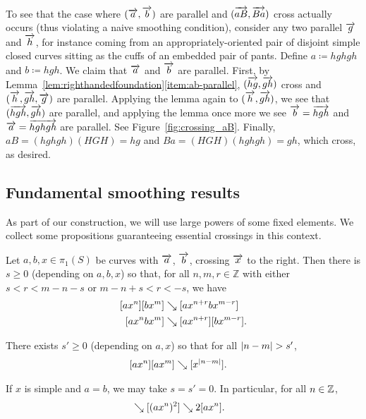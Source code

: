 \begin{example}
  To see that the case where $(\overrightarrow{a},\overrightarrow{b})$ are parallel and
  $(\overrightarrow{aB},\overrightarrow{Ba})$ cross actually occurs (thus
  violating a naive smoothing condition), consider any two parallel $\overrightarrow{g}$
  and $\overrightarrow{h}$, for instance coming from an appropriately-oriented
  pair of disjoint simple closed curves sitting
  as the cuffs of an embedded pair of pants.
  Define $a \coloneqq hghgh$ and $b
  \coloneqq hgh$. We claim that $\overrightarrow{a}$ and $\overrightarrow{b}$ are
  parallel. First, by
  Lemma~\ref{lem:righthandedfoundation}\ref{item:ab-parallel},
  $(\overrightarrow{hg},\overrightarrow{gh})$ cross and $(\overrightarrow{h},\overrightarrow{gh},\overrightarrow{g})$ are
  parallel. Applying the lemma again to $(\overrightarrow{h},\overrightarrow{gh})$, we see
  that $(\overrightarrow{hgh},\overrightarrow{gh})$ are parallel, and applying the lemma
  once more we see $\overrightarrow{b} = \overrightarrow{hgh}$ and $\overrightarrow{a} = \overrightarrow{hghgh}$
  are parallel. See Figure~\ref{fig:crossing_aB}.
  Finally, $aB=(hghgh)(HGH)=hg$ and $Ba=(HGH)(hghgh)=gh$, which cross,
  as desired.
  \label{ex:ab_parallel_aB_crossing}
\end{example}

\begin{figure}
\end{figure}


\subsection{Fundamental smoothing results}
\label{sec:fund-smoothing}

As part of our construction, we will use large powers of some fixed
elements. We collect some propositions guaranteeing essential
crossings in this context.
\begin{proposition}\label{prop:join-split-geom}
Let $a,b,x \in \pi_1(S)$ be curves with $\overrightarrow{a}$, $\overrightarrow{b}$,
crossing $\overrightarrow{x}$ to the right.
Then there is $s \ge 0$ (depending on $a,b,x$)
  so that, for all
 $n, m, r \in \mathbb{Z}$ with either $s < r < m-n-s$ or $m-n+s < r <
 -s$, we have
  \begin{align}
    \label{eq:cross-join}   [a x^n] [b x^m] &\mathrel{\searrow} [ax^{n+r}bx^{m-r}]\\
    \label{eq:cross-split} [a x^nb x^m] &\mathrel{\searrow} [ax^{n+r}][bx^{m-r}].
  \end{align}


  There exists $s' \ge 0$ (depending on $a,x$) so that for all
  $\lvert n-m\rvert > s'$,
  \begin{align}
    \label{eq:cross-cancel}[ax^n][ax^m] &\mathrel{\searrow} [x^{\lvert n-m\rvert}].
  \end{align}

 If $x$ is simple and $a=b$, we may take $s=s'=0$. In particular, for
 all $n\in\mathbb{Z}$,
 \begin{align}
    [a x^{n+1}] [a x^{n-1}] &\reducesto [(a x^n)^2] \reducesto 2[ax^{n}].\label{eq:cross-simple}
  \end{align}
\end{proposition}

